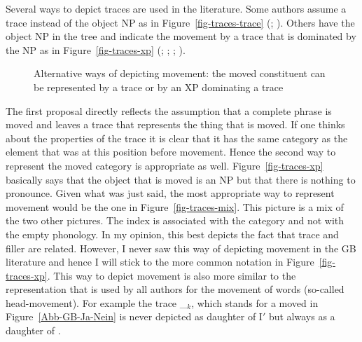 Several ways to depict traces are used in the literature. Some authors assume a trace instead of
the object NP as in Figure~\ref{fig-traces-trace} (\citealp[, 322]{Grewendorf88a};
\citealp[]{Haegeman94a-u}). Others have the object NP in the tree and indicate the movement
by a trace that is dominated by the NP as in Figure~\ref{fig-traces-xp} (\citealp[]{SS88a};
\citealp[]{Grewendorf88a}; %
\citealp[]{Haegeman94a-u}; \citealp[]{Sternefeld2006a-u}).
\begin{figure}[htb]
\hfill{}
\hfill
{}
\hfill
{}
\hfill\mbox{}
\caption{Alternative ways of depicting movement: the moved constituent can be represented by a trace
or by an XP dominating a trace}\label{fig-traces}
\end{figure}
The first proposal directly reflects the assumption that a complete phrase is moved and leaves a trace that
represents the thing that is moved. If one thinks about the properties of the trace it is clear that
it has the same category as the element that was at this position before movement. Hence the second
way to represent the moved category is appropriate as well. Figure~\ref{fig-traces-xp} basically says that the object that is moved is an NP but that there is
nothing to pronounce. Given what was just said, the most appropriate way to represent
movement would be the one in Figure~\ref{fig-traces-mix}. 
This picture is a mix of the two other pictures. The index is associated with
the category and not with the empty phonology. In my opinion, this best depicts the fact that trace and
filler are related. However, I never saw this way of depicting movement in the GB literature and
hence I will stick to the more common notation in Figure~\ref{fig-traces-xp}. This way to depict
movement is also more similar to the representation that is used by all authors for the movement of
words (so-called head-movement). For example the trace \_$_k$, which stands for a moved \inull in
Figure~\ref{Abb-GB-Ja-Nein} is never depicted as daughter of I$'$ but always as a daughter of \inull.


